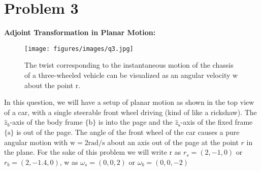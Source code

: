 \section*{Problem 3}

\textbf{Adjoint Transformation in Planar Motion:}
\begin{figure}[h]
    \centering
    \texttt{[image: figures/images/q3.jpg]}
    \caption{
        The twist corresponding to the instantaneous motion of the chassis of a three-wheeled vehicle can be visualized as an angular velocity w about the point r.
    }
\end{figure}

In this question, we will have a setup of planar motion as shown in the top view of a car, with a single steerable front wheel driving (kind of like a rickshaw).
The \( \hat{z}_{b} \)-axis of the body frame \( \{ \mathrm{b} \} \) is into the page and the \( \hat{z}_{\mathrm{s}} \)-axis of the fixed frame \( \{ \mathrm{s} \} \) is out of the page.
The angle of the front wheel of the car causes a pure angular motion with \( \mathrm{w}=2 \mathrm{rad} / \mathrm{s} \) about an axis out of the page at the point \( r \) in the plane.
For the sake of this problem we will write r as \( r_{s}=(2,-1,0) \) or \( r_{b}=(2,-1.4,0) \), w as \( \omega_{s}=(0,0,2) \) or \( \omega_{b}=(0,0,-2) \)

